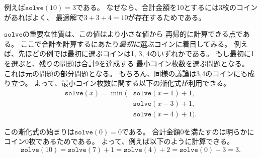 \begin{comment}
For example, $\texttt{solve}(10)=3$,
because at least 3 coins are needed
to form the sum 10.
The optimal solution is $3+3+4=10$.

The essential property of $\texttt{solve}$ is
that its values can be
recursively calculated from its smaller values.
The idea is to focus on the \emph{first}
coin that we choose for the sum.
For example, in the above scenario,
the first coin can be either 1, 3 or 4.
If we first choose coin 1,
the remaining task is to form the sum 9
using the minimum number of coins,
which is a subproblem of the original problem.
Of course, the same applies to coins 3 and 4.
Thus, we can use the following recursive formula
to calculate the minimum number of coins:
\end{comment}

例えば$\texttt{solve}(10)=3$である。
なぜなら、合計金額を10とするには3枚のコインがあればよく、
最適解で$3+3+4=10$が存在するためである。

$\texttt{solve}$の重要な性質は、この値はより小さな値から
再帰的に計算できる点である。
ここで合計を計算するにあたり\emph{最初に}選ぶコインに着目してみる。
例えば、先ほどの例では最初に選ぶコインは1, 3, 4のいずれかである。
もし最初に1を選ぶと、残りの問題は合計9を達成する
最小コイン枚数を選ぶ問題となる。
これは元の問題の部分問題となる。
もちろん、同様の議論は3,4のコインにも成り立つ。
よって、最小コイン枚数に関する以下の漸化式が利用できる。
\begin{equation*}
\begin{split}
\texttt{solve}(x) = \min( & \texttt{solve}(x-1)+1, \\
                           & \texttt{solve}(x-3)+1, \\
                           & \texttt{solve}(x-4)+1).
\end{split}
\end{equation*}

\begin{comment}
The base case of the recursion is $\texttt{solve}(0)=0$,
because no coins are needed to form an empty sum.
For example,
\[ \texttt{solve}(10) = \texttt{solve}(7)+1 = \texttt{solve}(4)+2 = \texttt{solve}(0)+3 = 3.\]

Now we are ready to give a general recursive function
that calculates the minimum number of
coins needed to form a sum $x$:
\end{comment}

この漸化式の始まりは$\texttt{solve}(0)=0$である。
合計金額0を満たすのは明らかにコイン0枚であるためである。
よって、例えば以下のように計算できる。
\[ \texttt{solve}(10) = \texttt{solve}(7)+1 = \texttt{solve}(4)+2 = \texttt{solve}(0)+3 = 3.\]

